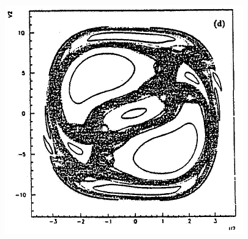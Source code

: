 \documentclass[a4,compress]{beamer}
\begin{document}
\begin{frame}
  \begin{columns}[c]
  \begin{column}{0.35\textwidth}
    \includegraphics[height=0.45\textheight]{ponicare-sections-e_240}


\end{column}
\end{columns}
\end{frame}
\end{document}
